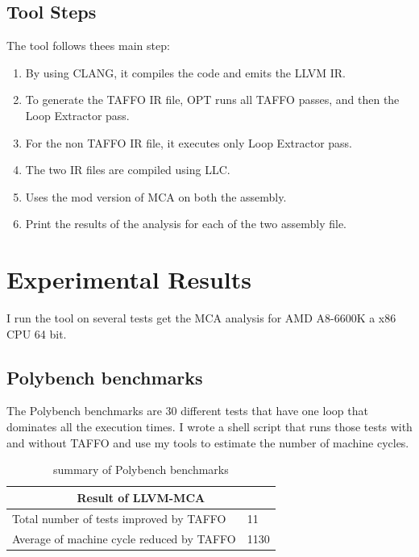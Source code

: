 \subsection{Tool Steps}
The tool follows thees main step:
\begin{enumerate}
\item By using CLANG, it compiles the code and emits the LLVM IR.
\item To generate the TAFFO IR file, OPT runs all TAFFO passes, and then the Loop Extractor pass.
\item For the non TAFFO IR file, it executes only Loop Extractor pass.
\item The two IR files are compiled using LLC.
\item Uses the mod version of MCA on both the assembly.
\item Print the results of the analysis for each of the two assembly file.
\end{enumerate}

\section{Experimental Results}
I run the tool on several tests get the MCA analysis for AMD A8-6600K a x86 CPU 64 bit.

\subsection{Polybench benchmarks}
The Polybench benchmarks are 30 different tests that have one loop that dominates all the execution times.
I wrote a shell script that runs those tests with and without TAFFO and use my tools to estimate the number of machine cycles.

\begin{table}[ht]
\begin{center}
\caption{summary of Polybench benchmarks}
\vspace{0.5cm}
\begin{tabular}{ |p{7cm} | p{4cm} | }
 \hline
 \multicolumn{2}{|c|}{Result of LLVM-MCA} \\
 \hline
  Total number of tests improved by TAFFO & 11  \\
  \hline
  Average of machine cycle reduced by TAFFO & 1130 \\
  \hline
\end{tabular}
\end{center}
\end{table}

